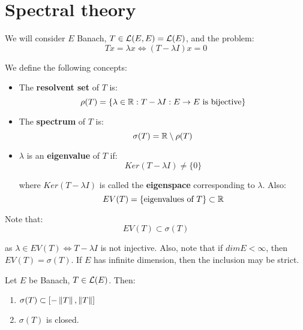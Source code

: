 \chapter{Spectral theory}

\begin{note}
    We will consider $E$ Banach, $T \in \mathcal{L}(E, E) = \mathcal{L}(E)$, and the problem:
    $$Tx = \lambda x \iff (T - \lambda I)x = 0$$
\end{note}

\begin{fdefinition}
    We define the following concepts:
    \vspace{1em}
    \begin{itemize}
        \item The \textbf{resolvent set} of $T$ is:
        $$\rho(T) = \{ \lambda \in \mathbb{R}: T - \lambda I: E \to E \text{ is bijective} \}$$

        \vspace{1em}
        \item The \textbf{spectrum} of $T$ is:
        $$\sigma(T) = \mathbb{R} \setminus \rho(T)$$

        \vspace{1em}
        \item $\lambda$ is an \textbf{eigenvalue} of $T$ if:
        $$Ker(T - \lambda I) \neq \{0\}$$

        where $Ker (T - \lambda I)$ is called the \textbf{eigenspace} corresponding to $\lambda$.
        Also:
        $$EV(T) = \{\text{eigenvalues of } T\} \subset \mathbb{R}$$
    \end{itemize}
\end{fdefinition}

\begin{fremark}
    Note that:
    $$EV(T) \subset \sigma(T)$$

    as $\lambda \in EV(T) \iff T - \lambda I$ is not injective. Also, note that if $dim E < \infty$, 
    then $EV(T) = \sigma(T)$. If $E$ has infinite dimension, then the inclusion may be strict.
\end{fremark}

\vspace{1em}

\begin{ftheorem}
    Let $E$ be Banach, $T \in \mathcal{L}(E)$. Then:
    \vspace{1em}
    \begin{enumerate}[label=(\roman*)]
        \item $\sigma(T) \subset [- \left\|T\right\|, \left\|T\right\|]$
        \vspace{1em}
        \item $\sigma(T)$ is closed.
    \end{enumerate}
\end{ftheorem}

